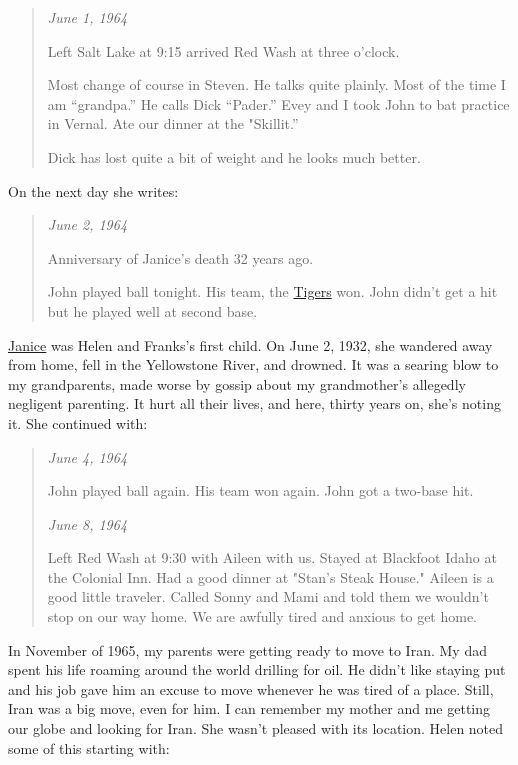 \begin{quote}
\emph{June 1, 1964}

Left Salt Lake at 9:15 arrived Red Wash at three o'clock. 

Most change of
course in Steven. He talks quite plainly. Most of the time I am
``grandpa.'' He calls Dick ``Pader.'' Evey and I took John to bat
practice in Vernal. Ate our dinner at the "Skillit.'' 

Dick has lost
quite a bit of weight and he looks much better.
\end{quote}

On the next day she writes:

\begin{quote}
\emph{June 2, 1964}

Anniversary of Janice's death 32 years ago. 

John played ball tonight.
His team, the \href{https://conceptcontrol.smugmug.com/People/From-Hazels-Albums-1/i-p5T4JPj/A}{Tigers} won. John didn't get a hit but he played well at
second base.
\end{quote}

\href{https://conceptcontrol.smugmug.com/People/Grandparents-1/i-JtMXdmL/A}{Janice} was Helen and Franks's first child. On June 2, 1932, she wandered
away from home, fell in the Yellowstone River, and drowned. It was a
searing blow to my grandparents, made worse by gossip about my
grandmother's allegedly negligent parenting. It hurt all their lives,
and here, thirty years on, she's noting it. She continued with:

\begin{quote}
\emph{June 4, 1964}

John played ball again. His team won again. John got a two-base hit.

\emph{June 8, 1964}

Left Red Wash at 9:30 with Aileen with us. Stayed at Blackfoot Idaho at
the Colonial Inn. Had a good dinner at "Stan's Steak House." Aileen is a
good little traveler. Called Sonny and Mami and told them we wouldn't
stop on our way home. We are awfully tired and anxious to get home.
\end{quote}

In November of 1965, my parents were getting ready to move to Iran. My
dad spent his life roaming around the world drilling for oil. He didn't
like staying put and his job gave him an excuse to move whenever he was
tired of a place. Still, Iran was a big move, even for him. I can
remember my mother and me getting our globe and looking for Iran. She
wasn't pleased with its location. Helen noted some of this starting
with:

